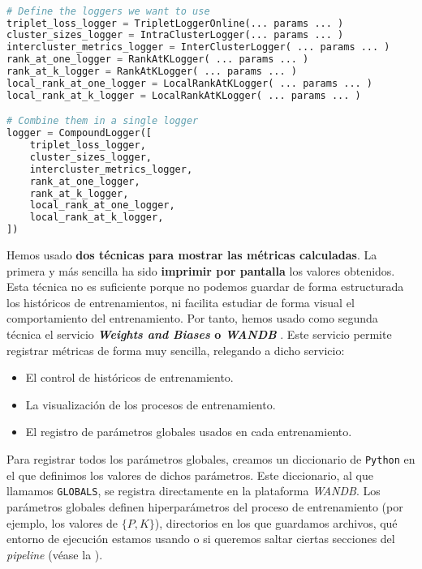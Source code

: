 \begin{lstlisting}[language=python, caption=Ejemplo de configuración del \textit{logging} de un entrenamiento con nuestro sistema propio. Se ve claramente la ventaja de usar un patrón \textit{composite} a la hora de configurar qué \textit{loggers} queremos usar, captionpos=b]

# Define the loggers we want to use
triplet_loss_logger = TripletLoggerOnline(... params ... )
cluster_sizes_logger = IntraClusterLogger(... params ... )
intercluster_metrics_logger = InterClusterLogger( ... params ... )
rank_at_one_logger = RankAtKLogger( ... params ... )
rank_at_k_logger = RankAtKLogger( ... params ... )
local_rank_at_one_logger = LocalRankAtKLogger( ... params ... )
local_rank_at_k_logger = LocalRankAtKLogger( ... params ... )

# Combine them in a single logger
logger = CompoundLogger([
    triplet_loss_logger,
    cluster_sizes_logger,
    intercluster_metrics_logger,
    rank_at_one_logger,
    rank_at_k_logger,
    local_rank_at_one_logger,
    local_rank_at_k_logger,
])
\end{lstlisting}

Hemos usado \textbf{dos técnicas para mostrar las métricas calculadas}. La primera y más sencilla ha sido \textbf{imprimir por pantalla} los valores obtenidos. Esta técnica no es suficiente porque no podemos guardar de forma estructurada los históricos de entrenamientos, ni facilita estudiar de forma visual el comportamiento del entrenamiento. Por tanto, hemos usado como segunda técnica el servicio \textbf{\textit{Weights and Biases} o \textit{WANDB}} \cite{informatica:wandb_web}. Este servicio permite registrar métricas de forma muy sencilla, relegando a dicho servicio:

\begin{itemize}
	\item El control de históricos de entrenamiento.
	\item La visualización de los procesos de entrenamiento.
	\item El registro de parámetros globales usados en cada entrenamiento.
\end{itemize}

Para registrar todos los parámetros globales, creamos un diccionario de \lstinline{Python} en el que definimos los valores de dichos parámetros. Este diccionario, al que llamamos \lstinline{GLOBALS}, se registra directamente en la plataforma \textit{WANDB}. Los parámetros globales definen hiperparámetros del proceso de entrenamiento (por ejemplo, los valores de $\{P, K\}$), directorios en los que guardamos archivos, qué entorno de ejecución estamos usando o si queremos saltar ciertas secciones del \textit{pipeline} (véase la ).
